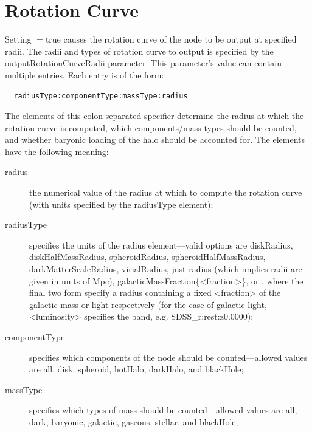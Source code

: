 \section{Rotation Curve}

Setting {\normalfont \ttfamily [outputRotationCurveData]}$=${\normalfont \ttfamily true} causes the rotation curve of the node to be output at specified radii. The radii and types of rotation curve to output is specified by the {\normalfont \ttfamily outputRotationCurveRadii} parameter. This parameter's value can contain multiple entries. Each entry is of the form:
\begin{verbatim}
  radiusType:componentType:massType:radius
\end{verbatim}
The elements of this colon-separated specifier determine the radius at which the rotation curve is computed, which components/mass types should be counted, and whether baryonic loading of the halo should be accounted for. The elements have the following meaning:
\begin{description}
 \item [{\normalfont \ttfamily radius}] the numerical value of the radius at which to compute the rotation curve (with units specified by the {\normalfont \ttfamily radiusType} element);
 \item [{\normalfont \ttfamily radiusType}] specifies the units of the {\normalfont \ttfamily radius} element---valid options are {\normalfont \ttfamily diskRadius}, {\normalfont \ttfamily diskHalfMassRadius}, {\normalfont \ttfamily spheroidRadius}, {\normalfont \ttfamily spheroidHalfMassRadius}, {\normalfont \ttfamily darkMatterScaleRadius}, {\normalfont \ttfamily virialRadius}, just {\normalfont \ttfamily radius} (which implies radii are given in units of Mpc), {\normalfont \ttfamily galacticMassFraction\{\textless fraction\textgreater\}}, or , where the final two form specify a radius containing a fixed {\normalfont \ttfamily \textless fraction\textgreater} of the galactic mass or light respectively (for the case of galactic light, {\normalfont \ttfamily \textless luminosity\textgreater} specifies the band, e.g. {\normalfont \ttfamily SDSS\_r:rest:z0.0000});
 \item [{\normalfont \ttfamily componentType}] specifies which components of the node should be counted---allowed values are {\normalfont \ttfamily all}, {\normalfont \ttfamily disk}, {\normalfont \ttfamily spheroid}, {\normalfont \ttfamily hotHalo}, {\normalfont \ttfamily darkHalo}, and {\normalfont \ttfamily blackHole};
 \item [{\normalfont \ttfamily massType}] specifies which types of mass should be counted---allowed values are {\normalfont \ttfamily all}, {\normalfont \ttfamily dark}, {\normalfont \ttfamily baryonic}, {\normalfont \ttfamily galactic}, {\normalfont \ttfamily gaseous}, {\normalfont \ttfamily stellar}, and {\normalfont \ttfamily blackHole};
\end{description}

